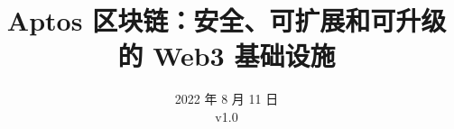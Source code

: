 \documentclass{article}
\title{Aptos 区块链：安全、可扩展和可升级的 Web3 基础设施}
\author{}
\date{2022 年 8 月 11 日\\v1.0}
\begin{document}
\maketitle

\renewcommand{\abstractname}{摘要}
\renewcommand{\figurename}{图}
\end{document}
